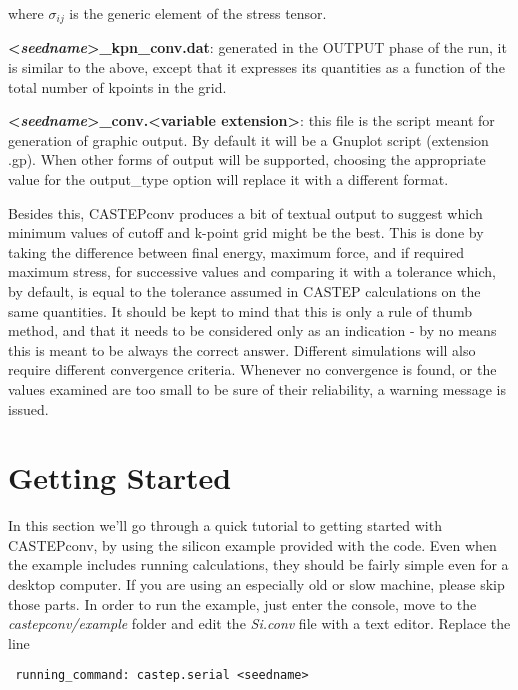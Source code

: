 \documentclass[10pt]{article}
\begin{document}
where $\sigma_{ij}$ is the generic element of the stress tensor.

\textbf{\textless \textit{seedname}\textgreater\_kpn\_conv.dat}: generated in 
the OUTPUT phase of the run, it is similar to the above, except that it 
expresses its quantities as a function of the total number of kpoints in the 
grid.

\textbf{\textless \textit{seedname}\textgreater\_conv.\textless variable 
extension\textgreater}: this file is the script meant for generation of graphic 
output. By default it will be a Gnuplot script (extension .gp). When other forms 
of output will be supported, choosing the appropriate value for the output\_type 
option will replace it with a different format.

Besides this, CASTEPconv produces a bit of textual output to suggest which 
minimum values of cutoff and k-point grid might be the best. This is done by 
taking the difference between final energy, maximum force, and if required 
maximum stress, for successive values and comparing it with a tolerance which, 
by default, is equal to the tolerance assumed in CASTEP calculations on the same 
quantities. It should be kept to mind that this is only a rule of thumb method, 
and that it needs to be considered only as an indication - by no means this is 
meant to be always the correct answer. Different simulations will also require 
different convergence criteria. Whenever no convergence is found, or the values 
examined are too small to be sure of their reliability, a warning message is 
issued.

\section{Getting Started}

In this section we'll go through a quick tutorial to getting started with CASTEPconv, by using the silicon example provided with the code. Even when the example includes running calculations, they should be fairly simple even for a desktop computer. If you are using an especially old or slow machine, please skip those parts.\newline
In order to run the example, just enter the console, move to the \textit{castepconv/example} folder and edit the \textit{Si.conv} file with a text editor. Replace the line

\begin{lstlisting}
 running_command: castep.serial <seedname>
\end{lstlisting}
\end{document}
